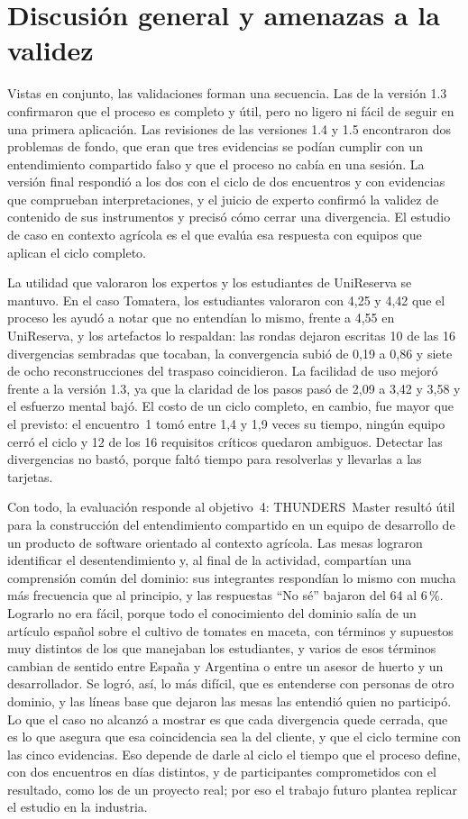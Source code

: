 \documentclass[12pt,letterpaper,oneside]{report}
\begin{document}
\section{Discusión general y amenazas a la validez}
\label{sec:discusion_general}
Vistas en conjunto, las validaciones forman una secuencia. Las de la versión 1.3
confirmaron que el proceso es completo y útil, pero no ligero ni fácil de seguir
en una primera aplicación. Las revisiones de las versiones 1.4 y 1.5 encontraron
dos problemas de fondo, que eran que tres evidencias se podían cumplir con un
entendimiento compartido falso y que el proceso no cabía en una sesión. La versión final
respondió a los dos con el ciclo de dos encuentros y con evidencias que
comprueban interpretaciones, y el juicio de experto confirmó la validez de
contenido de sus instrumentos y precisó cómo cerrar una divergencia. El estudio
de caso en contexto agrícola es el que evalúa esa respuesta con equipos que
aplican el ciclo completo.

La utilidad que valoraron los expertos y los estudiantes de UniReserva se
mantuvo. En el caso Tomatera, los estudiantes valoraron con 4,25 y 4,42 que el
proceso les ayudó a notar que no entendían lo mismo, frente a 4,55 en
UniReserva, y los artefactos lo respaldan: las rondas dejaron escritas 10 de
las 16 divergencias sembradas que tocaban, la convergencia subió de 0,19 a 0,86
y siete de ocho reconstrucciones del traspaso coincidieron. La facilidad de uso
mejoró frente a la versión 1.3, ya que la claridad de los pasos pasó de 2,09 a
3,42 y 3,58 y el esfuerzo mental bajó. El costo de un ciclo completo, en
cambio, fue mayor que el previsto: el encuentro~1 tomó entre 1,4 y 1,9 veces
su tiempo, ningún equipo cerró el ciclo y 12 de los 16 requisitos críticos
quedaron ambiguos. Detectar las divergencias no bastó, porque faltó tiempo para
resolverlas y llevarlas a las tarjetas.

Con todo, la evaluación responde al objetivo~4: THUNDERS~Master resultó útil para
la construcción del entendimiento compartido en un equipo de desarrollo de un
producto de software orientado al contexto agrícola. Las mesas lograron
identificar el desentendimiento y, al final de la actividad, compartían una
comprensión común del dominio: sus integrantes respondían lo mismo con mucha más
frecuencia que al principio, y las respuestas ``No sé'' bajaron del 64 al
6\,\%. Lograrlo no era fácil, porque todo el conocimiento del dominio salía de
un artículo español sobre el cultivo de tomates en maceta, con términos y
supuestos muy distintos de los que manejaban los estudiantes, y varios de esos
términos cambian de sentido entre España y Argentina o entre un asesor de huerto
y un desarrollador. Se logró, así, lo más difícil, que es entenderse con
personas de otro dominio, y las líneas base que dejaron las mesas las entendió
quien no participó. Lo que el caso no alcanzó a mostrar es que cada divergencia
quede cerrada, que es lo que asegura que esa coincidencia sea la del cliente, y
que el ciclo termine con las cinco evidencias. Eso depende de darle al ciclo el
tiempo que el proceso define, con dos encuentros en días distintos, y de
participantes comprometidos con el resultado, como los de un proyecto real; por
eso el trabajo futuro plantea replicar el estudio en la industria.
\end{document}
